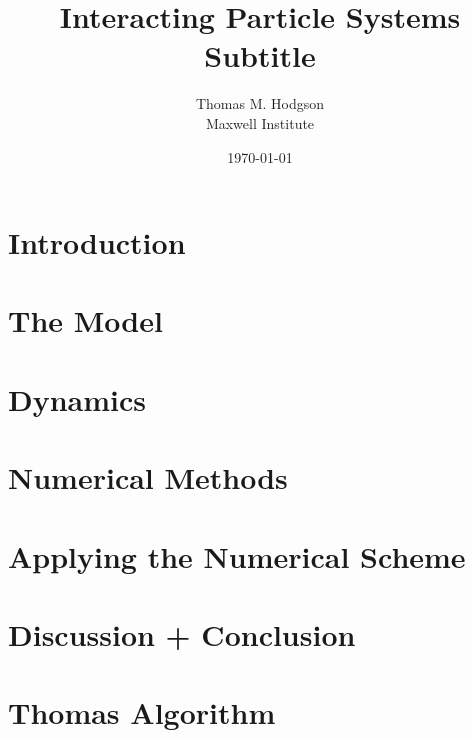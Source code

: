 \documentclass[11pt, a4paper, final]{article}
\title{{\huge Interacting Particle Systems} \\\vspace{1cm} Subtitle}
\author{Thomas M. Hodgson\\ \vspace{0.5cm} Maxwell Institute}
\date{\today}
\begin{document}
	\maketitle
    \thispagestyle{empty}
	\newpage
	\tableofcontents
	\listoffigures
	\newpage
    
	\section{Introduction}\label{sec:introduction}
        
       
	\section{The Model}\label{sec:model}
        
        
	\section{Dynamics}\label{sec:dynamics}
        
        
   	\section{Numerical Methods}\label{sec:numericalmethods}
        
        
    \section{Applying the Numerical Scheme}\label{sec:application}
        
        
    \section{Discussion + Conclusion}\label{sec:conclusion}
        

    
    
    \appendix
    \section{Thomas Algorithm}
\end{document}
